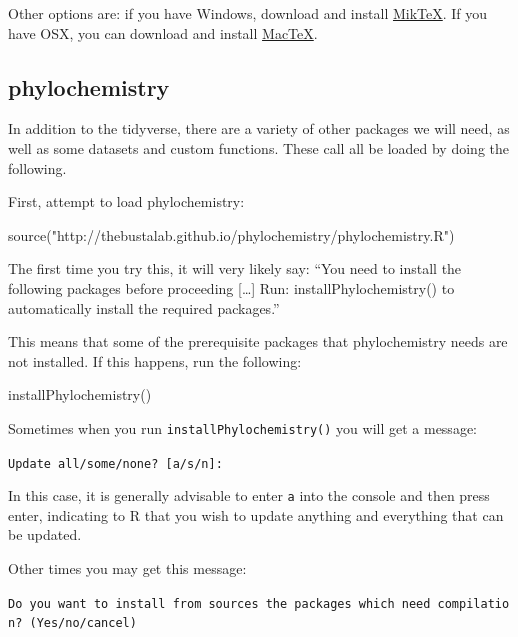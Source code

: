 \documentclass[
]{krantz}
\newenvironment{Shaded}{\begin{snugshade}}{\end{snugshade}}
\newcommand{\FunctionTok}[1]{\textcolor[rgb]{0.00,0.00,0.00}{#1}}
\newcommand{\NormalTok}[1]{#1}
\newcommand{\StringTok}[1]{\textcolor[rgb]{0.31,0.60,0.02}{#1}}
\begin{document}
Other options are: if you have Windows, download and install \href{https://miktex.org/download}{MikTeX}. If you have OSX, you can download and install \href{http://www.tug.org/mactex/morepackages.html}{MacTeX}.

\hypertarget{phylochemistry}{%
\subsection{phylochemistry}\label{phylochemistry}}

In addition to the tidyverse, there are a variety of other packages we will need, as well as some datasets and custom functions. These call all be loaded by doing the following.

First, attempt to load phylochemistry:

\begin{Shaded}
\begin{Highlighting}[]
\FunctionTok{source}\NormalTok{(}\StringTok{"http://thebustalab.github.io/phylochemistry/phylochemistry.R"}\NormalTok{)}
\end{Highlighting}
\end{Shaded}

The first time you try this, it will very likely say: ``You need to install the following packages before proceeding {[}\ldots{]} Run: installPhylochemistry() to automatically install the required packages.''

This means that some of the prerequisite packages that phylochemistry needs are not installed. If this happens, run the following:

\begin{Shaded}
\begin{Highlighting}[]
\FunctionTok{installPhylochemistry}\NormalTok{()}
\end{Highlighting}
\end{Shaded}

Sometimes when you run \texttt{installPhylochemistry()} you will get a message:

\texttt{Update\ all/some/none?\ {[}a/s/n{]}:}

In this case, it is generally advisable to enter \texttt{a} into the console and then press enter, indicating to R that you wish to update anything and everything that can be updated.

Other times you may get this message:

\texttt{Do\ you\ want\ to\ install\ from\ sources\ the\ packages\ which\ need\ compilation?\ (Yes/no/cancel)}
\end{document}
